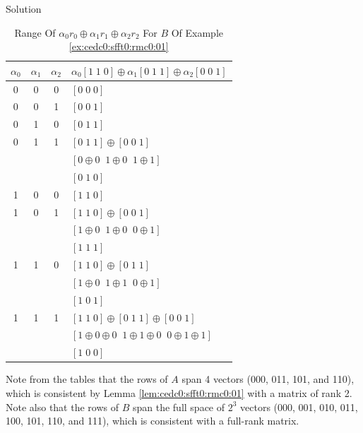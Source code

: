 \begin{vworkexampleparsection}{Solution}
\begin{table}
\caption{Range Of $\alpha_0 r_0 \oplus \alpha_1 r_1 \oplus \alpha_2 r_2$ For $B$ Of Example \ref{ex:cedc0:sfft0:rmc0:01}}
\label{tbl:cedc0:sfft0:rmc0:02}
\begin{center}
\begin{tabular}{|c|c|c|l|}
\hline
$\alpha_0$           &  $\alpha_1$                  & $\alpha_2$ &   $\alpha_0 [1 \; 1 \; 0] \oplus \alpha_1 [0 \; 1 \; 1] \oplus \alpha_2 [0 \; 0 \; 1]$   \\
\hline
\hline
0  & 0  & 0  & $[0\;0\;0]$ \\
\hline
0  & 0  & 1  & $[0\;0\;1]$ \\
\hline
0  & 1  & 0  & $[0\;1\;1]$ \\
\hline
0  & 1  & 1  & $[0\;1\;1] \oplus [0\;0\;1]$ \\
   &    &    & $[0 \oplus 0 \;\; 1 \oplus 0\;\; 1 \oplus 1]$ \\
   &    &    & $[0\;1\;0]$ \\
\hline
1  & 0  & 0  & $[1\;1\;0]$ \\
\hline
1  & 0  & 1  & $[1\;1\;0] \oplus [0\;0\;1]$ \\
   &    &    & $[1 \oplus 0 \;\; 1 \oplus 0\;\; 0 \oplus 1]$ \\
   &    &    & $[1\;1\;1]$ \\
\hline
1  & 1  & 0  & $[1\;1\;0] \oplus [0\;1\;1]$ \\
   &    &    & $[1 \oplus 0 \;\; 1 \oplus 1\;\; 0 \oplus 1]$ \\
   &    &    & $[1\;0\;1]$ \\
\hline
1  & 1  & 1  & $[1\;1\;0] \oplus [0\;1\;1] \oplus [0\;0\;1]$ \\
   &    &    & $[1 \oplus 0 \oplus 0 \;\; 1 \oplus 1 \oplus 0\;\; 0 \oplus 1 \oplus 1]$ \\
   &    &    & $[1\;0\;0]$ \\
\hline
\end{tabular}
\end{center}
\end{table}

Note from the tables that the rows of $A$ span 4 vectors 
(000, 011, 101, and 110), which is consistent 
by Lemma \ref{lem:cedc0:sfft0:rmc0:01} with a matrix of rank 2.
Note also that the rows of $B$ span the full space of
$2^3$ vectors (000, 001, 010, 011, 100, 101, 110, and 111), which
is consistent with a full-rank matrix.
\end{vworkexampleparsection}
\vworkexamplefooter{}


